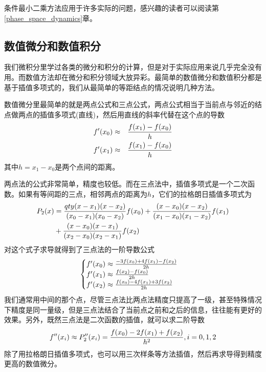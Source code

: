 \documentclass[12pt,a4paper,openany,twoside]{book}
\numberwithin{equation}{section}
\begin{document}
          条件最小二乘方法应用于许多实际的问题，感兴趣的读者可以阅读第\ref{phase_space_dynamics}章。

        \subsection{数值微分和数值积分}
          \label{numerical_differential_integral}
          我们微积分里学过各类的微分和积分的计算，但是对于实际应用来说几乎完全没有用。而数值方法却在微分和积分领域大放异彩。最简单的数值微分和数值积分都是基于插值多项式的，我们从最简单的等距结点的情况说明几种方法。

          数值微分里最简单的就是两点公式和三点公式，两点公式相当于当前点与邻近的结点做两点的插值多项式(直线)，然后用直线的斜率代替在这个点的导数
          \begin{equation}
            \begin{aligned}
              f'\qty(x_0)&\approx&\frac{f\qty(x_1)-f\qty(x_0)}{h}\\
              f'\qty(x_1)&\approx&\frac{f\qty(x_1)-f\qty(x_0)}{h}
            \end{aligned}
          \end{equation}
          其中$h=x_1-x_0$是两个点间的距离。
          
          两点法的公式非常简单，精度也较低。而在三点法中，插值多项式是一个二次函数。如果有等间距的三点，相邻两点的距离为$h$，它们的拉格朗日插值多项式为
          \begin{equation*}
            \begin{aligned}
              P_2\qty(x)&=\frac{qty(x-x_1)\qty(x-x_2)}{\qty(x_0-x_1)\qty(x_0-x_2)}f\qty(x_0)+\frac{\qty(x-x_0)\qty(x-x_2)}{\qty(x_1-x_0)\qty(x_1-x_2)}f\qty(x_1) \\
              &+\frac{\qty(x-x_0)\qty(x-x_1)}{\qty(x_2-x_0)\qty(x_2-x_1)}f\qty(x_2)
            \end{aligned}
          \end{equation*}
          对这个式子求导就得到了三点法的一阶导数公式
          \begin{equation}
            \begin{cases}
              f'\qty(x_0)\approx\frac{-3f\qty(x_0)+4f\qty(x_1)-f\qty(x_2)}{2h} \\
              f'\qty(x_1)\approx\frac{f\qty(x_2)-f\qty(x_0)}{2h} \\
              f'\qty(x_2)\approx\frac{f\qty(x_0)-4f\qty(x_1)+3f\qty(x_2)}{2h}
            \end{cases}
          \end{equation}
          我们通常用中间的那个点，尽管三点法比两点法精度只提高了一级，甚至特殊情况下精度是同一量级，但是三点法结合了当前点之前和之后的信息，往往能有更好的效果。另外，既然三点法是二次函数的插值，就可以求二阶导数
          \begin{equation}
            f''\qty(x_i)\approx P''_2\qty(x_i)=\frac{f\qty(x_0)-2f\qty(x_1)+f\qty(x_2)}{h^2}, i=0,1,2
          \end{equation}
          除了用拉格朗日插值多项式，也可以用三次样条等方法插值，然后再求导得到精度更高的数值微分。
\end{document}
